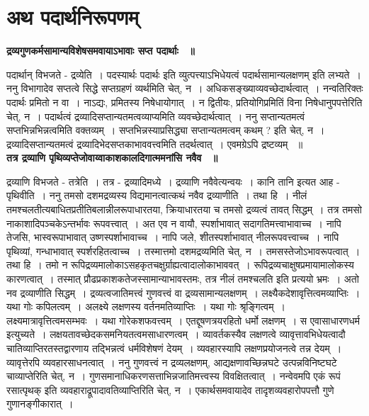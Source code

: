 \section*{अथ पदार्थनिरूपणम्}
{\bfseries द्रव्यगुणकर्मसामान्यविशेषसमवायाऽभावाः सप्त पदार्थाः ~॥}\par
 पदार्थान् विभजते - द्रव्येति~। पदस्यार्थः पदार्थः इति व्युत्पत्त्याऽभिधेयत्वं पदार्थसामान्यलक्षणम् इति लभ्यते~। ननु विभागादेव सप्तत्वे सिद्धे सप्तग्रहणं व्यर्थमिति चेत्, न~। अधिकसङ्ख्याव्यवच्छेदार्थत्वात्~। नन्वतिरिक्तः पदार्थः प्रमितो न वा~। नाऽद्यः, प्रमितस्य निषेधायोगात्~। न द्वितीयः, प्रतियोगिप्रमितिं विना निषेधानुपपत्तेरिति चेत्, न~। पदार्थत्वं द्रव्यादिसप्तान्यतमत्वव्याप्यमिति व्यवच्छेदार्थत्वात्~। ननु सप्तान्यतमत्वं सप्तभिन्नभिन्नत्वमिति वक्तव्यम्~। सप्तभिन्नस्याप्रसिद्ध्या सप्तान्यतमत्वम् कथम् ? इति चेत्, न~। द्रव्यादिसप्तान्यतमत्वं द्रव्यादिभेदसप्तकाभाववत्त्वमिति तदर्थत्वात्~। एवमग्रेऽपि द्रष्टव्यम् ~॥\\[10pt]
{\bfseries तत्र द्रव्याणि पृथिव्यप्तेजोवाय्वाकाशकालदिगात्ममनांसि नवैव ~॥}\par
	द्रव्याणि विभजते - तत्रेति~। तत्र - द्रव्यादिमध्ये~। द्रव्याणि नवैवेत्यन्वयः~। कानि तानि इत्यत आह - पृथिवीति~। ननु तमसो दशमद्रव्यस्य विद्यमानत्वात्कथं नवैव द्रव्याणीति~। तथा हि~। नीलं तमश्चलतीत्यबाधितप्रतीतिबलान्नीलरूपाधारतया, क्रियाधारतया च तमसो द्रव्यत्वं तावत् सिद्धम्~। तत्र तमसो नाकाशादिपञ्चकेऽन्तर्भावः रूपवत्त्वात्~। अत एव न वायौ, स्पर्शाभावात् सदागतिमत्त्वाभावाच्च~। नापि तेजसि, भास्वरूपाभावात् उष्णस्पर्शाभावाच्च~। नापि जले, शीतस्पर्शाभावात् नीलरूपवत्त्वाच्च~। नापि पृथिव्यां, गन्धाभावात् स्पर्शरहितत्वाच्च~। तस्मात्तमो दशमद्रव्यमिति चेत्, न~। तमसस्तेजोऽभावरूपत्वात्~। तथा हि~। तमो न रूपिद्रव्यमालोकाऽसहकृतचक्षुर्ग्राह्यत्वादालोकाभाववत्~। रूपिद्रव्यचाक्षुषप्रमायामालोकस्य कारणत्वात्~। तस्मात् प्रौढप्रकाशकतेजस्सामान्याभावस्तमः, तत्र नीलं तमश्चलति इति प्रत्ययो भ्रमः~। अतो नव द्रव्याणीति सिद्धम्~। द्रव्यत्वजातिमत्त्वं गुणवत्त्वं वा द्रव्यसामान्यलक्षणम्~। लक्ष्यैकदेशावृत्तित्वमव्याप्तिः~। यथा गोः कपिलत्वम्~। अलक्ष्ये लक्षणस्य वर्तनमतिव्याप्तिः~। यथा गोः श्रृङ्गित्वम्~। लक्ष्यमात्रावृत्तित्वमसम्भवः~। यथा गोरेकशफवत्त्वम्~। एतद्दूषणत्रयरहितो धर्मो लक्षणम्~। स एवासाधारणधर्म इत्युच्यते~। लक्षयतावच्छेदकसमनियतत्वमसाधारणत्वम्~। व्यावर्तकस्यैव लक्षणत्वे व्यावृत्तावभिधेयत्वादौ चातिव्याप्तिरतस्तद्वारणाय तद्भिन्नत्वं धर्मविशेषणं देयम्~। व्यवहारस्यापि लक्षणप्रयोजनत्वे तन्न देयम्~। व्यावृत्तेरपि व्यवहारसाधनत्वात्~। ननु गुणवत्त्वं न द्रव्यलक्षणम्, आद्यक्षणावच्छिन्नघटे उत्पन्नविनिष्टघटे चाव्याप्तेरिति चेत्, न~। गुणसमानाधिकरणसत्ताभिन्नजातिमत्त्वस्य विवक्षितत्वात्~। नन्वेवमपि एकं रूपं रसात्पृथक् इति व्यवहाराद्रूपादावतिव्याप्तिरिति चेत्, न~। एकार्थसमवायादेव तादृशव्यवहारोपपत्तौ गुणे गुणानङ्गीकारात्~।\\[10pt]
